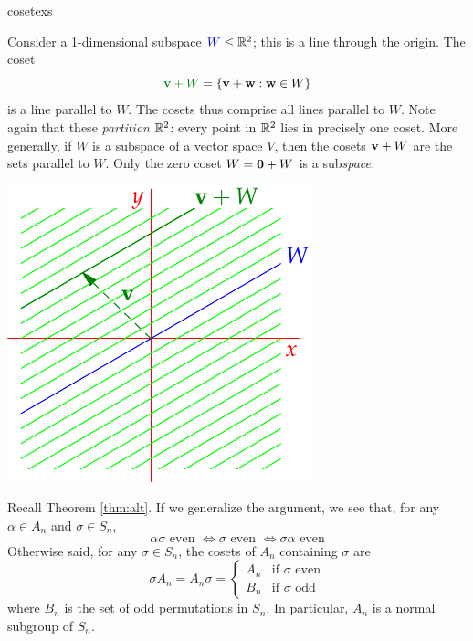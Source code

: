\begin{examples}{}{cosetexs}
\begin{enumerate}
	  
	\begin{minipage}[t]{0.62\linewidth}\vspace{0pt}
		\item Consider a 1-dimensional subspace $\textcolor{blue}{W}\le\mathbb{R}^2$; this is a line through the origin. The coset
		\[\textcolor{Green}{\vv+W}=\{\vv+\vw:\vw\in W\}\]
		is a line parallel to $W$. The cosets thus comprise all lines parallel to $W$. Note again that these \emph{partition} $\mathbb{R}^2$: every point in $\mathbb{R}^2$ lies in precisely one coset.\smallbreak
		More generally, if $W$ is a subspace of a vector space $V$, then the cosets ${\mathbf{v}}+ W$ are the sets parallel to $W$. Only the zero coset $W=\mathbf{0}+W$ is a sub\emph{space.}
	\end{minipage}\hfill\begin{minipage}[t]{0.36\linewidth}\vspace{0pt}
	\flushright\includegraphics[scale=0.93]{coset-coset}
	\end{minipage}
	
	
		\item Recall Theorem \ref{thm:alt}. If we generalize the argument, we see that, for any $\alpha\in A_n$ and $\sigma\in S_n$,
		\[\alpha\sigma\text{ even }\iff \sigma\text{ even }\iff \sigma\alpha\text{ even}\]
		Otherwise said, for any $\sigma\in S_n$, the cosets of $A_n$ containing $\sigma$ are
		\[\sigma A_n=A_n\sigma=\begin{cases}
			A_n&\text{if $\sigma$ even}\\
			B_n&\text{if $\sigma$ odd}
		\end{cases}\]
		where $B_n$ is the set of odd permutations in $S_n$. In particular, $A_n$ is a normal subgroup of $S_n$.
	\end{enumerate}
\end{examples}

